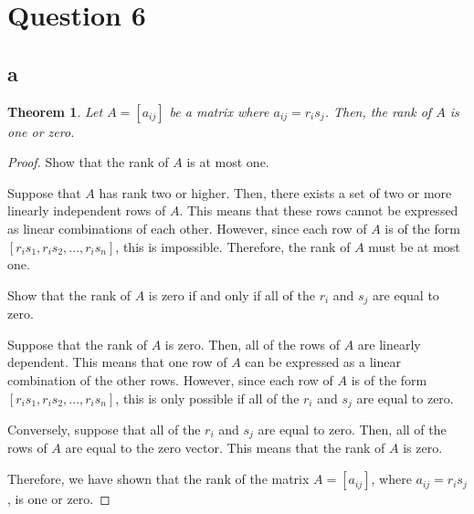 \section{Question 6}
\subsection{a}
\newtheorem{theorem}{Theorem}
\newtheorem{lemma}[theorem]{Lemma}

\begin{theorem}
Let $A = [a_{ij}]$ be a matrix where $a_{ij} = r_i s_j$. Then, the rank of $A$ is one or zero.
\end{theorem}

\begin{proof}
Show that the rank of $A$ is at most one.

Suppose that $A$ has rank two or higher. Then, there exists a set of two or more linearly independent rows of $A$. This means that these rows cannot be expressed as linear combinations of each other. However, since each row of $A$ is of the form $[r_i s_1, r_i s_2, \ldots, r_i s_n]$, this is impossible. Therefore, the rank of $A$ must be at most one.

Show that the rank of $A$ is zero if and only if all of the $r_i$ and $s_j$ are equal to zero.

Suppose that the rank of $A$ is zero. Then, all of the rows of $A$ are linearly dependent. This means that one row of $A$ can be expressed as a linear combination of the other rows. However, since each row of $A$ is of the form $[r_i s_1, r_i s_2, \ldots, r_i s_n]$, this is only possible if all of the $r_i$ and $s_j$ are equal to zero.

Conversely, suppose that all of the $r_i$ and $s_j$ are equal to zero. Then, all of the rows of $A$ are equal to the zero vector. This means that the rank of $A$ is zero.

Therefore, we have shown that the rank of the matrix $A = [a_{ij}]$, where $a_{ij} = r_i s_j$, is one or zero.

\end{proof}

